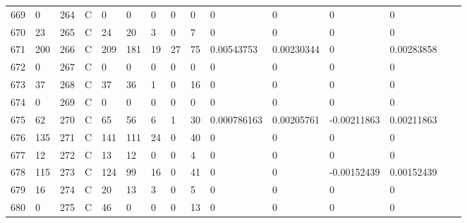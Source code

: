 \begin{longtable}{lllllllllllllll}
	669 & 0                 & 264 & C   & 0                 & 0                 & 0                 & 0    & 0          & 0              & 0              & 0             & 0            \\
	670 & 23                & 265 & C   & 24                & 20                & 3                 & 0    & 7          & 0              & 0              & 0             & 0            \\
	671 & 200               & 266 & C   & 209               & 181               & 19                & 27   & 75         & 0.00543753     & 0.00230344     & 0             & 0.00283858   \\
	672 & 0                 & 267 & C   & 0                 & 0                 & 0                 & 0    & 0          & 0              & 0              & 0             & 0            \\
	673 & 37                & 268 & C   & 37                & 36                & 1                 & 0    & 16         & 0              & 0              & 0             & 0            \\
	674 & 0                 & 269 & C   & 0                 & 0                 & 0                 & 0    & 0          & 0              & 0              & 0             & 0            \\
	675 & 62                & 270 & C   & 65                & 56                & 6                 & 1    & 30         & 0.000786163    & 0.00205761     & -0.00211863   & 0.00211863   \\
	676 & 135               & 271 & C   & 141               & 111               & 24                & 0    & 40         & 0              & 0              & 0             & 0            \\
	677 & 12                & 272 & C   & 13                & 12                & 0                 & 0    & 4          & 0              & 0              & 0             & 0            \\
	678 & 115               & 273 & C   & 124               & 99                & 16                & 0    & 41         & 0              & 0              & -0.00152439   & 0.00152439   \\
	679 & 16                & 274 & C   & 20                & 13                & 3                 & 0    & 5          & 0              & 0              & 0             & 0            \\
	680 & 0                 & 275 & C   & 46                & 0                 & 0                 & 0    & 13         & 0              & 0              & 0             & 0            \\

\end{longtable}
